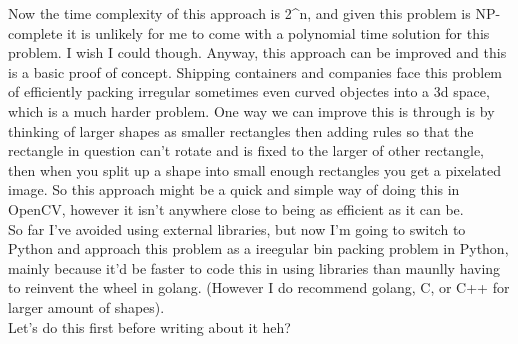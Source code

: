 \documentclass[a4paper]{article}
\begin{document}
   Now the time complexity of this approach is 2^n, and given this problem is NP-complete it is unlikely for me to come with a polynomial time solution for this problem. I wish I could though. Anyway, this approach can be improved and this is a basic proof of concept. Shipping containers and companies face this problem of efficiently packing irregular sometimes even curved objectes into a 3d space, which is a much harder problem. One way we can improve this is through is by thinking of larger shapes as smaller rectangles then adding rules so that the rectangle in question can't rotate and is fixed to the larger of other rectangle, then when you split up a shape into small enough rectangles you get a pixelated image. So this approach might be a quick and simple way of doing this in OpenCV, however it isn't anywhere close to being as efficient as it can be.\\


    So far I've avoided using external libraries, but now I'm going to switch to Python and approach this problem as a ireegular bin packing problem in Python, mainly because it'd be faster to code this in using libraries than maunlly having to reinvent the wheel in golang. (However I do recommend golang, C, or C++ for larger amount of shapes). \\

    Let's do this first before writing about it heh?\\








    

 

\end{document}
